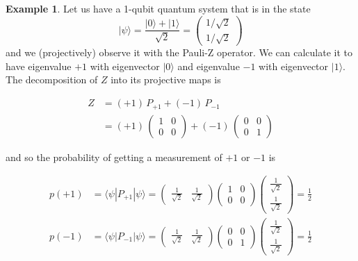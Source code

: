 \documentclass{article}
\theoremstyle{definition}
\newtheorem{example}{Example}[section]
\begin{document}
  \begin{example}
    Let us have a 1-qubit quantum system that is in the state
    \[|\psi \rangle = \frac{|0\rangle + |1 \rangle}{\sqrt{2}} = \begin{pmatrix} 1/\sqrt{2} \\ 1/\sqrt{2} \end{pmatrix}\]
    and we (projectively) observe it with the Pauli-Z operator. We can calculate it to have eigenvalue $+1$ with eigenvector $|0\rangle$ and eigenvalue $-1$ with eigenvector $|1\rangle$. The decomposition of $Z$ into its projective maps is

    \begin{align*}
      Z & = (+1) \, P_{+1} + (-1)\, P_{-1} \\
      & = (+1) \, \begin{pmatrix} 1&0\\0&0 \end{pmatrix} + (-1)\, \begin{pmatrix} 0&0\\0&1 \end{pmatrix}
    \end{align*}

    and so the probability of getting a measurement of $+1$ or $-1$ is

    \begin{align*}
      p(+1) & = \langle \psi | P_{+1} | \psi \rangle = \begin{pmatrix} \frac{1}{\sqrt{2}} & \frac{1}{\sqrt{2}} \end{pmatrix} \begin{pmatrix} 1&0\\0&0 \end{pmatrix} \begin{pmatrix} \frac{1}{\sqrt{2}} \\ \frac{1}{\sqrt{2}} \end{pmatrix} = \frac{1}{2} \\
      p(-1) & = \langle \psi | P_{-1} | \psi \rangle = \begin{pmatrix} \frac{1}{\sqrt{2}} & \frac{1}{\sqrt{2}} \end{pmatrix} \begin{pmatrix} 0&0\\0&1 \end{pmatrix} \begin{pmatrix} \frac{1}{\sqrt{2}} \\ \frac{1}{\sqrt{2}} \end{pmatrix} = \frac{1}{2}
    \end{align*}
  \end{example}
\end{document}
